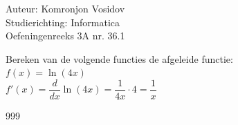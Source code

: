 \documentclass[a4paper]{article}
\begin{document}
	
	\noindent \large Auteur: Komronjon Vosidov \\
	\noindent \large Studierichting: Informatica\\
	\noindent \large Oefeningenreeks 3A nr. 36.1\\
	
	\medskip
	
	\normalsize
	 Bereken van de volgende functies de afgeleide functie:\\
	
	$f(x) = \ln(4x)$\\
	
	$f'(x) = \dfrac{d}{dx} \ln(4x) = \dfrac{1}{4x} \cdot 4 = \dfrac{1}{x}$
	
	
	\begin{thebibliography}{999}
	\end{thebibliography}	
	
\end{document}
